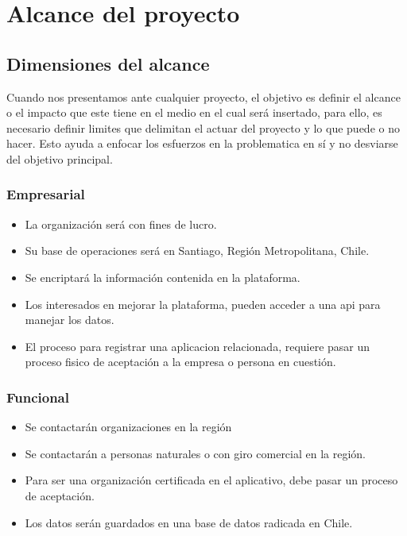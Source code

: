 \documentclass[letterpaper,openright,10pt,oneside]{report}
\begin{document}
			\chapter{Alcance del proyecto}
				\section{Dimensiones del alcance}
					Cuando nos presentamos ante cualquier proyecto, el objetivo es definir el alcance o el impacto que este tiene en el medio en el cual será insertado, para ello, es necesario definir limites que delimitan el actuar del proyecto y lo que puede o no hacer. Esto ayuda a enfocar los esfuerzos en la problematica en sí y no desviarse del objetivo principal.
					\subsection{Empresarial}
						\begin{itemize}
							\item La organización será con fines de lucro.
							\item Su base de operaciones será en Santiago, Región Metropolitana, Chile.
							\item Se encriptará la información contenida en la plataforma.
							\item Los interesados en mejorar la plataforma, pueden acceder a una api para manejar los datos.
							\item El proceso para registrar una aplicacion relacionada, requiere pasar un proceso fisico de aceptación a la empresa o persona en cuestión.
						\end{itemize}
					\subsection{Funcional}
						\begin{itemize}
							\item Se contactarán organizaciones en la región
							\item Se contactarán a personas naturales o con giro comercial en la región.
							\item Para ser una organización certificada en el aplicativo, debe pasar un proceso de aceptación.
							\item Los datos serán guardados en una base de datos radicada en Chile.
\end{itemize}
\end{document}
